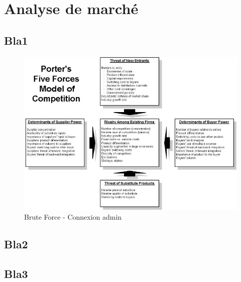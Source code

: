 \newpage

\section{Analyse de marché}

\subsection{Bla1}

\begin{figure}[H]
\begin{center}


\includegraphics[scale=0.48]{images/porter/porter_1}

\caption{Brute Force - Connexion admin}
\label{inclusion}
\end{center}
\end{figure}


\subsection{Bla2}





\subsection{Bla3}


